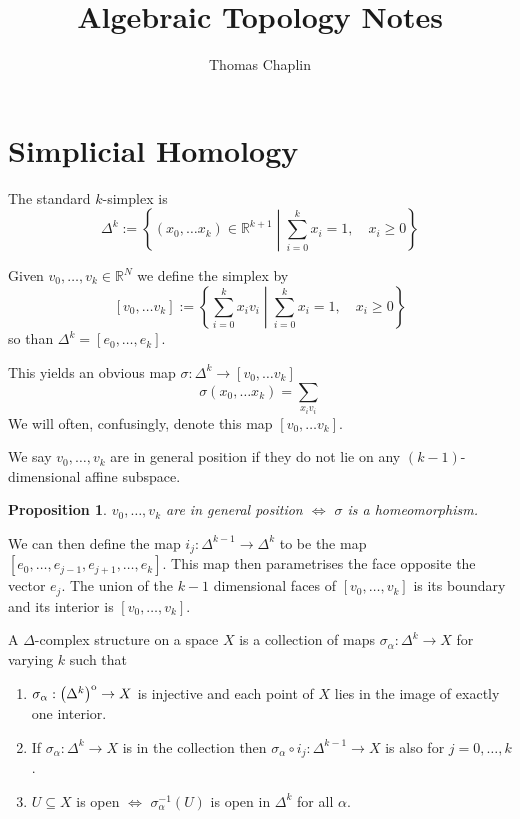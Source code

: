 \documentclass[11pt]{article}
\title{Algebraic Topology Notes}
\author{Thomas Chaplin}
\date{}
\newcommand{\defeq}{:=}
\newcommand{\relmiddle}[1]{\mathrel{}\middle#1\mathrel{}}
\newcommand{\rmv}{\relmiddle|}
\newcommand{\interior}[1]{%
  {\kern0pt#1}^{\mathrm{o}}%
}
\newcommand{\R}{\mathbb{R}}
\newenvironment{defin}
	{\begin{mdframed}[backgroundcolor=white, roundcorner=5pt, linewidth=1pt]}
	{\end{mdframed}}
\newcommand{\mdf}[1]{{\color{red} #1}}
\newtheorem{prop}[theorem]{Proposition}
\begin{document}
\maketitle

\section{Simplicial Homology}

The \mdf{standard $k$-simplex} is	
\[
	\Delta^k\defeq\left\{(x_0, \dots x_k)\in \R^{k+1} \rmv \sum_{i=0}^{k}x_i = 1, \quad x_i\geq 0\right\}
\]

Given $v_0, \dots, v_k\in \R^N$ we define the \mdf{simplex} by
\[
	[v_0, \dots v_k] \defeq \left\{\sum_{i=0}^{k}x_i v_i \rmv \sum_{i=0}^{k }x_i = 1, \quad x_i \geq 0\right\}
\]
so than $\Delta^k=[e_0, \dots, e_k]$.

This yields an obvious map $\sigma:\Delta^k\to [ v_0, \dots v_k]$
\[
	\sigma(x_0, \dots x_k)=\sum_{x_i v_i}
\]
We will often, confusingly, denote this map $[v_0, \dots v_k]$.

We say $v_0, \dots, v_k$ are \mdf{in general position} if they do not lie on any $(k-1)$-dimensional affine subspace.

\begin{prop}
$v_0, \dots, v_k$ are in general position $\iff$ $\sigma$ is a homeomorphism.
\end{prop}

We can then define the map $i_j:\Delta^{k-1}\to\Delta^k$ to be the map $[e_0, \dots, e_{j-1}, e_{j+1}, \dots, e_k]$.
This map then parametrises the face opposite the vector $e_j$.
The union of the $k-1$ dimensional faces of $[v_0, \dots, v_k]$ is its \mdf{boundary} and its \mdf{interior} is $[v_0, \dots, v_k]$.

\begin{defin}
	A \mdf{$\Delta$-complex structure} on a space $X$ is a collection of maps $\sigma_\alpha:\Delta^k\to X$ for varying $k$ such that
	\begin{enumerate}
		\item $\sigma_\alpha:\interior{\left( \Delta^k \right)}\to X$ is injective and each point of $X$ lies in the image of exactly one interior.
		\item If $\sigma_\alpha:\Delta^k\to X$ is in the collection then $\sigma_\alpha\circ i_j:\Delta^{k-1}\to X$ is also for $j=0, \dots, k$.
		\item $U\subseteq X$ is open $\iff$ $\sigma_\alpha^{-1}(U)$ is open in $\Delta^k$ for all $\alpha$.
	\end{enumerate}
\end{defin}
\end{document}
